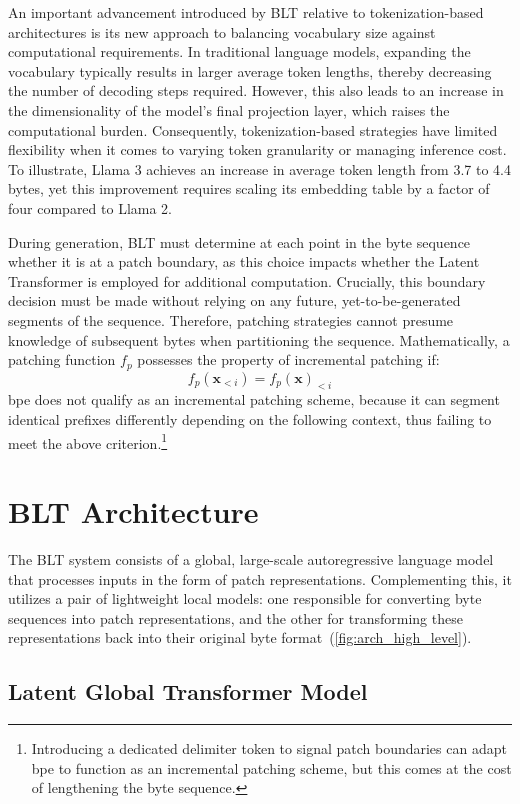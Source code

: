 An important advancement introduced by {\textsc BLT} relative to tokenization-based architectures is its new approach to balancing vocabulary size against computational requirements. In traditional language models, expanding the vocabulary typically results in larger average token lengths, thereby decreasing the number of decoding steps required. However, this also leads to an increase in the dimensionality of the model’s final projection layer, which raises the computational burden. Consequently, tokenization-based strategies have limited flexibility when it comes to varying token granularity or managing inference cost. To illustrate, Llama 3 achieves an increase in average token length from 3.7 to 4.4 bytes, yet this improvement requires scaling its embedding table by a factor of four compared to Llama 2.

During generation, {\textsc BLT} must determine at each point in the byte sequence whether it is at a patch boundary, as this choice impacts whether the Latent Transformer is employed for additional computation. Crucially, this boundary decision must be made without relying on any future, yet-to-be-generated segments of the sequence. Therefore, patching strategies cannot presume knowledge of subsequent bytes when partitioning the sequence. Mathematically, a patching function $f_p$ possesses the property of incremental patching if:
$$f_p(\pmb{x}_{<i}) = f_p(\pmb{x})_{<i}$$
bpe does not qualify as an incremental patching scheme, because it can segment identical prefixes differently depending on the following context, thus failing to meet the above criterion.\footnote{Introducing a dedicated delimiter token to signal patch boundaries can adapt bpe to function as an incremental patching scheme, but this comes at the cost of lengthening the byte sequence.}

\section{{\textsc BLT} Architecture}
\label{section:architecture}
The {\textsc BLT} system consists of a global, large-scale autoregressive language model that processes inputs in the form of patch representations. Complementing this, it utilizes a pair of lightweight local models: one responsible for converting byte sequences into patch representations, and the other for transforming these representations back into their original byte format~(\autoref{fig:arch_high_level}).

\subsection{Latent Global Transformer Model}

